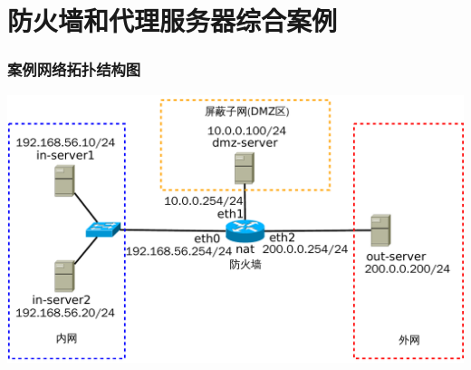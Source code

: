 \documentclass[xcolor=svgnames,presentation]{beamer}
\begin{document}
\section{防火墙和代理服务器综合案例}
\label{sec-5}
\begin{frame}
\frametitle{案例网络拓扑结构图}
\label{sec-5-1}

\includegraphics[width=.9\linewidth]{img/dmzlab.pdf}
\end{frame}
\end{document}
